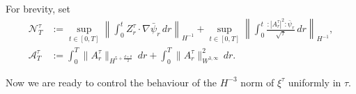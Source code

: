 \documentclass[a4paper,10pt]{amsart}
\newcommand{\norm}[1]{\left\|#1\right\|}
\newcommand{\wick}[1]{:\mathrel{#1}:}
\newcommand{\expt}[1]{\mathbb{E}\left[#1\right]}
\newcommand{\Bk}{\color{black}}
\newcommand{\Rd}{\color{red}}
\newtheorem{proposition}[theorem]{Proposition}
\theoremstyle{remark}
\numberwithin{equation}{section}
\begin{document}
For brevity, set
\begin{align*}
\mathcal N_T^\tau
&:=\sup_{t\in[0,T]}
\norm{\int_0^t Z^{\tau}_r\cdot\nabla\bar{\psi}_r\,dr}_{H^{-1}}+\sup_{t\in[0,T]}
\norm{\int_0^t
\frac{\wick{|A^\tau_r|^2}\bar{\psi}_r}{\sqrt{\tau}}\,dr}_{H^{-1}},\\[1mm]
\mathcal A_T^\tau
&:=\int_0^T\|A^\tau_r\|_{H^{5+\frac{d+\theta}{2}}}\,dr
+\int_0^T\|A^\tau_r\|_{W^{3,\infty}}^2\,dr.
\end{align*}


Now we are ready to control the behaviour of the $H^{-3}$ norm of $\xi^{\tau}$ uniformly in $\tau$.
\end{document}

